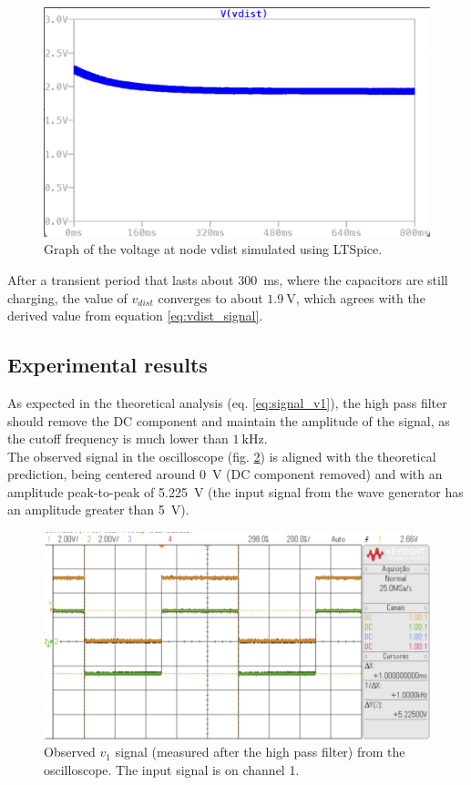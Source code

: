 \documentclass[lettersize,journal]{IEEEtran}
\begin{document}
\begin{figure}
    \centering
    \includegraphics[width=\linewidth]{images/week1_vdist.png}
    \caption{Graph of the voltage at node vdist simulated using LTSpice.}
    \label{fig:vdist-sim}
\end{figure}

After a transient period that lasts about \SI{300}{\ms}, where the capacitors are still charging, the value of $v_{dist}$ converges to about $\SI{1.9}{\volt}$, which agrees with the derived value from equation \ref{eq:vdist_signal}.

\subsection{Experimental results}

As expected in the theoretical analysis (eq. \ref{eq:signal_v1}), the high pass filter should remove the DC component and maintain the amplitude of the signal, as the cutoff frequency is much lower than $\SI{1}{\kilo \hertz}$.\\

The observed signal in the oscilloscope (fig. \ref{fig:v1}) is aligned with the theoretical prediction, being centered around \SI{0}{V} (DC component removed) and with an amplitude peak-to-peak of \SI{5.225}{\volt} (the input signal from the wave generator has an amplitude greater than \SI{5}{\volt}).

\begin{figure}
    \centering
    \includegraphics[width=\linewidth]{images/v1_scope.png}
    \caption{Observed $v_1$ signal (measured after the high pass filter) from the oscilloscope. The input signal is on channel 1.}
    \label{fig:v1}
\end{figure}
\end{document}
